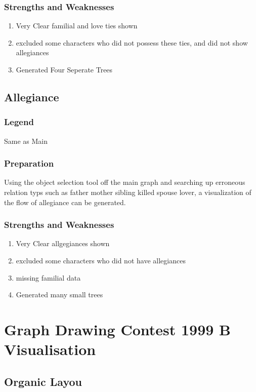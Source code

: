 \documentclass[twoside]{article}
\theoremstyle{definition}
\theoremstyle{definition}
\begin{document}
\subsubsection{Strengths and Weaknesses}
\begin{enumerate}
	\item Very Clear familial and love ties shown
	\item excluded some characters who did not possess these ties, and did not show allegiances
	\item Generated Four Seperate Trees
\end{enumerate}
\subsection{Allegiance}
\subsubsection{Legend}
Same as Main
\subsubsection{Preparation}
Using the object selection tool off the main graph and searching up erroneous relation typs such as father mother sibling killed spouse lover, a visualization of the flow of allegiance can be generated. 
\subsubsection{Strengths and Weaknesses}
\begin{enumerate}
	\item Very Clear allgegiances shown
	\item excluded some characters who did not have allegiances 
	\item missing familial data 
	\item Generated many small trees 
\end{enumerate}
\newpage

\newpage

\newpage
\section{Graph Drawing Contest 1999 B Visualisation}
\subsection{Organic Layou}
\end{document}
